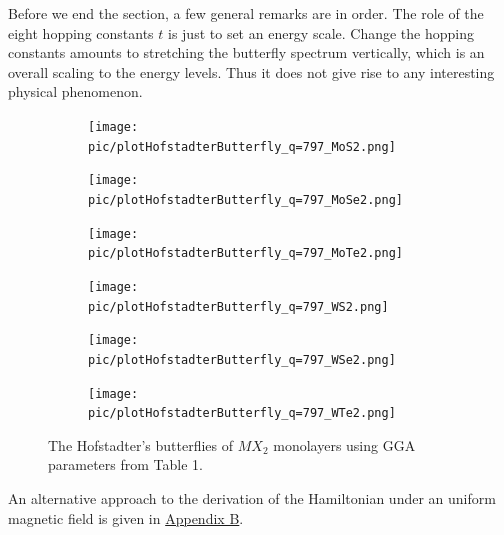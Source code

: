 \documentclass{report}
\begin{document}
Before we end the section, a few general remarks are in order. The role of the eight hopping constants $t$ is just to set an energy scale. Change the hopping constants amounts to stretching the butterfly spectrum vertically, which is an overall scaling to the energy levels. Thus it does not give rise to any interesting physical phenomenon.
\begin{figure}[htb]
	\centering
	\begin{subfigure}[b]{0.32\linewidth}
		\centering
		\texttt{[image: pic/plotHofstadterButterfly\_q=797\_MoS2.png]}
		\label{fig:matt 1}
	\end{subfigure}
	\begin{subfigure}[b]{0.32\linewidth}
		\centering
		\texttt{[image: pic/plotHofstadterButterfly\_q=797\_MoSe2.png]}
		\label{fig:matt 2}
	\end{subfigure}
	\begin{subfigure}[b]{0.32\linewidth}
		\centering
		\texttt{[image: pic/plotHofstadterButterfly\_q=797\_MoTe2.png]}
		\label{fig:matt 3}
	\end{subfigure}
	\begin{subfigure}[b]{0.32\linewidth}
		\centering
		\texttt{[image: pic/plotHofstadterButterfly\_q=797\_WS2.png]}
		\label{fig:matt 4}
	\end{subfigure}
	\begin{subfigure}[b]{0.32\linewidth}
		\centering
		\texttt{[image: pic/plotHofstadterButterfly\_q=797\_WSe2.png]}
		\label{fig:matt 5}
	\end{subfigure}
	\begin{subfigure}[b]{0.32\linewidth}
		\centering
		\texttt{[image: pic/plotHofstadterButterfly\_q=797\_WTe2.png]}
		\label{fig:matt 6}
	\end{subfigure}
	\caption{
		The Hofstadter’s butterflies of $MX_{2}$ monolayers using GGA parameters from Table 1.
	}
\end{figure}




An alternative approach to the derivation of the Hamiltonian under an uniform magnetic field is given in \hyperref[appendix b]{Appendix B}.
\end{document}
